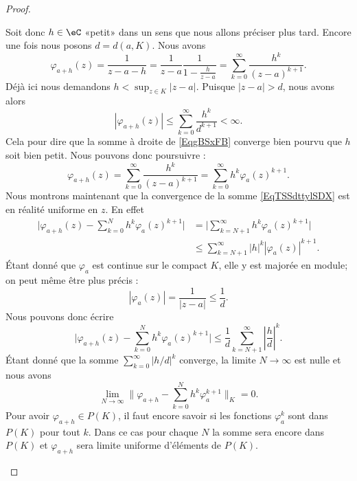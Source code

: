 \begin{proof}
\begin{subproof}
		Soit donc \( h\in \eC\) «petit» dans un sens que nous allons préciser plus tard. Encore une fois nous posons \( d=d(a,K)\). Nous avons
		\begin{equation}        \label{EqgBSxFB}
			\varphi_{a+h}(z)=\frac{1}{ z-a-h }=\frac{1}{ z-a }\frac{1}{ 1-\frac{ h }{ z-a } }=\sum_{k=0}^{\infty}\frac{ h^k }{ (z-a)^{k+1} }.
		\end{equation}
		Déjà ici nous demandons \( h<\sup_{z\in K}| z-a |\). Puisque \( | z-a |>d\), nous avons alors
		\begin{equation}
			| \varphi_{a+h}(z) |\leq \sum_{k=0}^{\infty}\frac{ h^k }{ d^{k+1} }<\infty.
		\end{equation}
		Cela pour dire que la somme à droite de \eqref{EqgBSxFB} converge bien pourvu que \( h\) soit bien petit. Nous pouvons donc poursuivre :
		\begin{equation}    \label{EqTSSdttylSDX}
			\varphi_{a+h}(z)=\sum_{k=0}^{\infty}\frac{ h^k }{ (z-a)^{k+1} }=\sum_{k=0}^{\infty}h^k\varphi_a(z)^{k+1}.
		\end{equation}
		Nous montrons maintenant que la convergence de la somme \eqref{EqTSSdttylSDX} est en réalité uniforme en \( z\). En effet
		\begin{subequations}
			\begin{align}
				\big| \varphi_{a+h}(z)-\sum_{k=0}^Nh^k\varphi_a(z)^{k+1} \big| & =\big| \sum_{k=N+1}^{\infty}h^k\varphi_a(z)^{k+1} \big| \\
				                                                               & \leq\sum_{k=N+1}^{\infty}| h |^k| \varphi_a(z) |^{k+1}.
			\end{align}
		\end{subequations}
		Étant donné que \( \varphi_a\) est continue sur le compact \( K\), elle y est majorée en module; on peut même être plus précis :
		\begin{equation}
			|\varphi_a(z)|=\frac{1}{ | z-a | }\leq \frac{1}{ d }.
		\end{equation}
		Nous pouvons donc écrire
		\begin{equation}
			\big| \varphi_{a+h}(z)-\sum_{k=0}^Nh^k\varphi_a(z)^{k+1} \big|\leq\frac{1}{ d }\sum_{k=N+1}^{\infty}\left| \frac{ h }{ d } \right|^k.
		\end{equation}
		Étant donné que la somme \( \sum_{k=0}^{\infty}| h/d |^k\) converge, la limite \( N\to \infty\) est nulle et nous avons
		\begin{equation}
			\lim_{N\to \infty} \| \varphi_{a+h}-\sum_{k=0}^Nh^k\varphi_a^{k+1} \|_K=0.
		\end{equation}
		Pour avoir \( \varphi_{a+h}\in P(K)\), il faut encore savoir si les fonctions \( \varphi_a^{k}\) sont dans \( P(K)\) pour tout \( k\). Dans ce cas pour chaque \( N\) la somme sera encore dans \( P(K)\) et \( \varphi_{a+h}\) sera limite uniforme d'éléments de \( P(K)\).


\end{subproof}
\end{proof}
